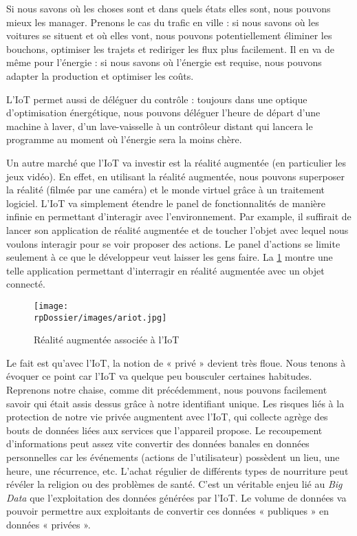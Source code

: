 Si nous savons où les choses sont et dans quels états elles sont, nous pouvons mieux les manager. Prenons le cas du trafic en ville : si nous savons où les voitures se situent et où elles vont, nous pouvons potentiellement éliminer les bouchons, optimiser les trajets et rediriger les flux plus facilement. Il en va de même pour l'énergie : si nous savons où l'énergie est requise, nous pouvons adapter la production et optimiser les coûts.


L'IoT permet aussi de déléguer du contrôle : toujours dans une optique d'optimisation énergétique, nous pouvons déléguer l'heure de départ d'une machine à laver, d'un lave-vaisselle à un contrôleur distant qui lancera le programme au moment où l'énergie sera la moins chère.


Un autre marché que l'IoT va investir est la réalité augmentée (en particulier les jeux vidéo). En effet, en utilisant la réalité augmentée, nous pouvons superposer la réalité (filmée par une caméra) et le monde virtuel grâce à un traitement logiciel. L'IoT va simplement étendre le panel de fonctionnalités de manière infinie en permettant d'interagir avec l'environnement. Par example, il suffirait de lancer son application de réalité augmentée et de toucher l'objet avec lequel nous voulons interagir pour se voir proposer des actions. Le panel d'actions se limite seulement à ce que le développeur veut laisser les gens faire. La \cref{ariot} montre une telle application permettant d’interragir en réalité augmentée avec un objet connecté.

\begin{figure}[H]
\centering
\texttt{[image: \\rpDossier/images/ariot.jpg]}
\caption{Réalité augmentée associée à l’IoT}
\label{ariot}
\end{figure}


Le fait est qu'avec l'IoT, la notion de « privé » devient très floue. Nous tenons à évoquer ce point car l'IoT va quelque peu bousculer certaines habitudes. Reprenons notre chaise, comme dit précédemment, nous pouvons facilement savoir qui était assis dessus grâce à notre identifiant unique. Les risques liés à la protection de notre vie privée augmentent avec l'IoT, qui collecte agrège des bouts de données liées aux services que l'appareil propose. Le recoupement d'informations peut assez vite convertir des données banales en données personnelles car les événements (actions de l'utilisateur) possèdent un lieu, une heure, une récurrence, etc. L'achat régulier de différents types de nourriture peut révéler la religion ou des problèmes de santé. C'est un véritable enjeu lié au \emph{Big Data} que l'exploitation des données générées par l'IoT. Le volume de données va pouvoir permettre aux exploitants de convertir ces données « publiques » en données « privées ».

